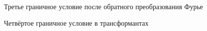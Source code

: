 \documentclass[a4paper, 12pt]{article}
\begin{document}
\begin{figure}[h!]
\noindent{}
\caption{Третье граничное условие после обратного преобразования Фурье}
\label{figCurves}
\end{figure}


\begin{figure}[h!]
\noindent{}
\caption{Четвёртое граничное условие в трансформантах}
\label{figCurves}
\end{figure}
\end{document}
